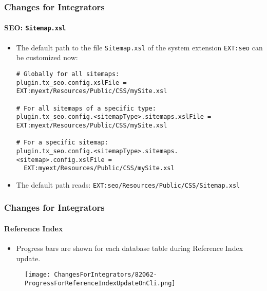 
\begin{frame}[fragile]
	\frametitle{Changes for Integrators}
	\framesubtitle{SEO: \texttt{Sitemap.xsl}}

	\lstset{basicstyle=\tiny\ttfamily}

	\begin{itemize}
		\item The default path to the file \texttt{Sitemap.xsl} of the system extension
			\texttt{EXT:seo} can be customized now:

\vspace{-0.4cm}
\begin{lstlisting}
# Globally for all sitemaps:
plugin.tx_seo.config.xslFile = EXT:myext/Resources/Public/CSS/mySite.xsl

# For all sitemaps of a specific type:
plugin.tx_seo.config.<sitemapType>.sitemaps.xslFile = EXT:myext/Resources/Public/CSS/mySite.xsl

# For a specific sitemap:
plugin.tx_seo.config.<sitemapType>.sitemaps.<sitemap>.config.xslFile =
  EXT:myext/Resources/Public/CSS/mySite.xsl
\end{lstlisting}

		\item The default path reads:\newline
			\smaller
				\texttt{EXT:seo/Resources/Public/CSS/Sitemap.xsl}
			\normalsize

	\end{itemize}

\end{frame}


\begin{frame}[fragile]
	\frametitle{Changes for Integrators}
	\framesubtitle{Reference Index}

	\lstset{basicstyle=\tiny\ttfamily}

	\begin{itemize}
		\item Progress bars are shown for each database table during Reference Index update.
	\end{itemize}

	\begin{figure}
		\texttt{[image: ChangesForIntegrators/82062-ProgressForReferenceIndexUpdateOnCli.png]}
	\end{figure}

\end{frame}

